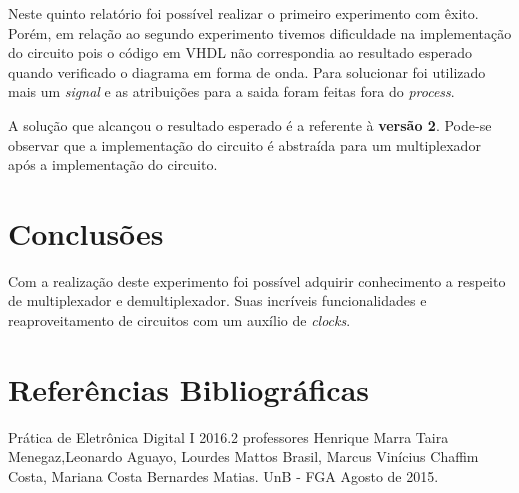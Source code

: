 \documentclass[12pts]{article}
\begin{document}
        Neste quinto relatório foi possível realizar o primeiro experimento com êxito. Porém, em relação ao segundo experimento tivemos dificuldade na implementação do circuito pois o código em VHDL não correspondia ao resultado esperado quando verificado o diagrama em forma de onda. Para solucionar foi utilizado mais um \textit{signal} e as atribuições para a saida foram feitas fora do \textit{process}.
        
        A solução que alcançou o resultado esperado é a referente à \textbf{versão 2}. Pode-se observar que a implementação do circuito é abstraída para um multiplexador após a implementação do circuito.

\section{Conclusões}

Com a realização deste experimento foi possível adquirir conhecimento a respeito de multiplexador e demultiplexador. Suas incríveis funcionalidades e reaproveitamento de circuitos com um auxílio de \textit{clocks}.

\section{Referências Bibliográficas}

Prática de Eletrônica Digital I 2016.2 professores Henrique Marra Taira Menegaz,Leonardo Aguayo, Lourdes Mattos Brasil, Marcus Vinícius Chaffim Costa, Mariana Costa Bernardes Matias. UnB - FGA Agosto de 2015.

\newpage
\end{document}
